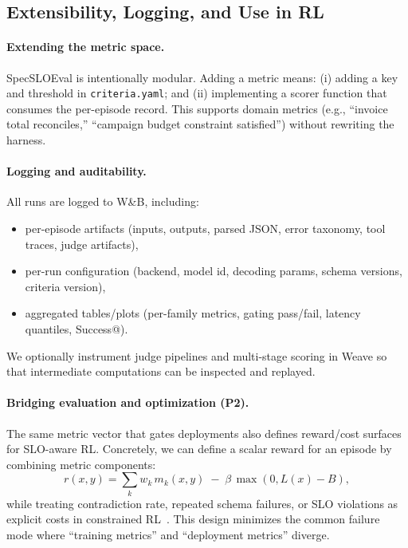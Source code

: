 \subsection{Extensibility, Logging, and Use in RL}
\label{sec:extensibility-rl}

\paragraph{Extending the metric space.}
SpecSLOEval is intentionally modular.
Adding a metric means:
(i) adding a key and threshold in \texttt{criteria.yaml}; and
(ii) implementing a scorer function that consumes the per-episode record.
This supports domain metrics (e.g., “invoice total reconciles,” “campaign budget constraint satisfied”) without rewriting the harness.

\paragraph{Logging and auditability.}
All runs are logged to W\&B, including:
\begin{itemize}[leftmargin=12pt]
    \item per-episode artifacts (inputs, outputs, parsed JSON, error taxonomy, tool traces, judge artifacts),
    \item per-run configuration (backend, model id, decoding params, schema versions, criteria version),
    \item aggregated tables/plots (per-family metrics, gating pass/fail, latency quantiles, Success@\slo).
\end{itemize}
We optionally instrument judge pipelines and multi-stage scoring in Weave so that intermediate computations can be inspected and replayed.

\paragraph{Bridging evaluation and optimization (P2).}
The same metric vector that gates deployments also defines reward/cost surfaces for SLO-aware RL.
Concretely, we can define a scalar reward for an episode by combining metric components:
\[
r(x,y) = \sum_{k} w_k\, m_k(x,y) \;-\; \beta\,\max(0, L(x)-B),
\]
while treating contradiction rate, repeated schema failures, or SLO violations as explicit costs in constrained RL~\citep{altman1999cmdp,achiam2017cpo}.
This design minimizes the common failure mode where “training metrics” and “deployment metrics” diverge.

